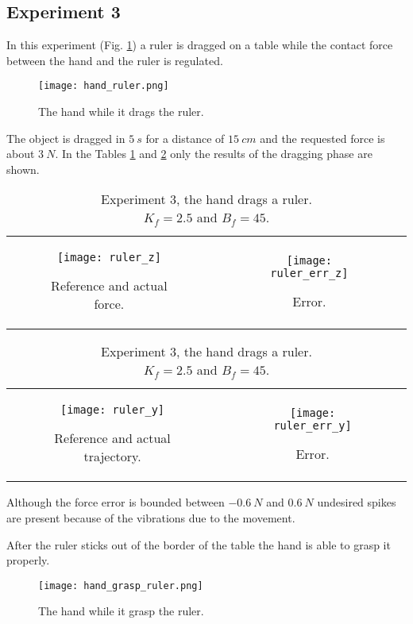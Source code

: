 \subsection{Experiment 3}
In this experiment (Fig. \ref{fig:hand_ruler}) a ruler is dragged
on a table while the contact force between the hand and the ruler is regulated.
\begin{figure}[h]
  \centering
  \texttt{[image: hand\_ruler.png]}
  \caption{The hand while it drags the ruler. \label{fig:hand_ruler}}
\end{figure}
The object is dragged in $\SI{5}{s}$ for a distance of $\SI{15}{cm}$ and the requested force is about $\SI{3}{N}$.
In the Tables \ref{fig:ruler1} and \ref{fig:ruler2} only the results of the dragging phase are shown.
\begin{table}[h]
  \begin{tabular}{cc}
    \begin{subfigure}{0.5\textwidth}
      \centering
      \texttt{[image: ruler\_z]}
      \caption{Reference and actual force. \label{fig:ruler_z}}
    \end{subfigure}&
    \begin{subfigure}{0.5\textwidth}
      \centering
      \texttt{[image: ruler\_err\_z]}
      \caption{Error. \label{fig:ruler_error_z}}
    \end{subfigure}
  \end{tabular}
  \caption{Experiment 3, the hand drags a ruler.\\
    $K_f = 2.5$ and $B_f = 45$.}\label{fig:ruler1}
\end{table}
\begin{table}[h]
  \begin{tabular}{cc}
    \begin{subfigure}{0.5\textwidth}
      \centering
      \texttt{[image: ruler\_y]}
      \caption{Reference and actual trajectory. \label{fig:ruler_y}}
    \end{subfigure}&
    \begin{subfigure}{0.5\textwidth}
      \centering
      \texttt{[image: ruler\_err\_y]}
      \caption{Error. \label{fig:ruler_error_y}}
    \end{subfigure}
  \end{tabular}
  \caption{Experiment 3, the hand drags a ruler.\\
  $K_f = 2.5$ and $B_f = 45$.}\label{fig:ruler2}
\end{table}
\par
Although the force error is bounded between $\SI{-0.6}{N}$ and 
$\SI{0.6}{N}$ undesired spikes are present because of
the vibrations due to the movement.
\par
After the ruler sticks out of the border of the table the hand is able to grasp
it properly.
\begin{figure}[h]
  \centering
  \texttt{[image: hand\_grasp\_ruler.png]}
  \caption{The hand while it grasp the ruler. \label{fig:hand_grasp_ruler}}
\end{figure}
\newpage
